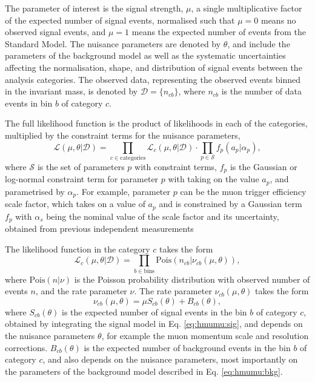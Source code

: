 The parameter of interest is the signal strength, $\mu$, a single
multiplicative factor of the expected number of signal events,
normalised such that $\mu = 0$ means no observed signal events,
and $\mu=1$ means the expected number of events from the Standard Model.
The nuisance parameters are denoted by $\theta$, and include the 
parameters of the background model as well as the systematic
uncertainties affecting the normalisation, shape, and distribution
of signal events between the analysis categories. The observed data,
representing the observed events binned in the invariant mass, is
denoted by $\mathcal{D} = \{n_{cb}\}$, where $n_{cb}$ is the number of
data events in bin $b$ of category $c$.

The full likelihood function is the product of likelihoods
in each of the categories, multiplied by the constraint 
terms for the nuisance parameters,
\begin{equation}
\mathcal{L}(\mu, \theta | \mathcal{D}) =
\prod_{c \in \text{categories}} \mathcal{L}_c(\mu, \theta | \mathcal{D}) \cdot
\prod_{p \in \mathcal{S}} f_p (a_p | \alpha_p),
\end{equation}
where $\mathcal{S}$ is the set of parameters $p$ with constraint
terms, $f_p$ is the Gaussian or log-normal constraint term for parameter $p$
with taking on the value $a_p$, and parametrised by $\alpha_p$. For example, parameter
$p$ can be the muon trigger efficiency scale factor, which takes on a
value of $a_p$ and is constrained by a Gaussian term $f_p$ with
$\alpha_s$ being the nominal value of the scale factor and its uncertainty,
obtained from previous independent measurements

The likelihood function in the category $c$ takes the form
\begin{equation}
\mathcal{L}_c (\mu, \theta | \mathcal{D}) =
\prod_{b \in \text{bins}} \text{Pois}(n_{cb} | \nu_{cb} (\mu, \theta)),
\end{equation}
where $\text{Pois}(n | \nu)$ is the Poisson probability distribution
with observed number of events $n$, and the rate parameter $\nu$.
The rate parameter $\nu_{cb}(\mu, \theta)$ takes the form
\begin{equation}
\nu_{cb}(\mu, \theta) = \mu S_{cb}(\theta) + B_{cb}(\theta),
\end{equation}
where $S_{cb}(\theta)$ is the expected number of signal events in
the bin $b$ of category $c$, obtained by integrating the signal
model in Eq. \ref{eq:hmumu:sig}, and depends on the nuisance
parameters $\theta$, for example the muon momentum scale
and resolution corrections. $B_{cb}(\theta)$ is the expected
number of background events in the bin $b$ of category $c$, and
also depends on the nuisance parameters, most importantly on the
parameters of the background model described in Eq. \ref{eq:hmumu:bkg}.

